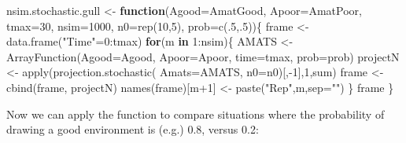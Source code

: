 \documentclass[
]{book}
\newenvironment{Shaded}{\begin{snugshade}}{\end{snugshade}}
\newcommand{\AttributeTok}[1]{\textcolor[rgb]{0.77,0.63,0.00}{#1}}
\newcommand{\ControlFlowTok}[1]{\textcolor[rgb]{0.13,0.29,0.53}{\textbf{#1}}}
\newcommand{\DecValTok}[1]{\textcolor[rgb]{0.00,0.00,0.81}{#1}}
\newcommand{\FunctionTok}[1]{\textcolor[rgb]{0.00,0.00,0.00}{#1}}
\newcommand{\NormalTok}[1]{#1}
\newcommand{\OtherTok}[1]{\textcolor[rgb]{0.56,0.35,0.01}{#1}}
\newcommand{\SpecialCharTok}[1]{\textcolor[rgb]{0.00,0.00,0.00}{#1}}
\newcommand{\StringTok}[1]{\textcolor[rgb]{0.31,0.60,0.02}{#1}}
\begin{document}
\begin{Shaded}
\begin{Highlighting}[]
\NormalTok{nsim.stochastic.gull }\OtherTok{\textless{}{-}} \ControlFlowTok{function}\NormalTok{(}\AttributeTok{Agood=}\NormalTok{AmatGood, }
                                 \AttributeTok{Apoor=}\NormalTok{AmatPoor, }
                                 \AttributeTok{tmax=}\DecValTok{30}\NormalTok{, }
                                 \AttributeTok{nsim=}\DecValTok{1000}\NormalTok{, }
                                 \AttributeTok{n0=}\FunctionTok{rep}\NormalTok{(}\DecValTok{10}\NormalTok{,}\DecValTok{5}\NormalTok{), }
                                 \AttributeTok{prob=}\FunctionTok{c}\NormalTok{(.}\DecValTok{5}\NormalTok{,.}\DecValTok{5}\NormalTok{))\{}
\NormalTok{  frame }\OtherTok{\textless{}{-}}  \FunctionTok{data.frame}\NormalTok{(}\StringTok{"Time"}\OtherTok{=}\DecValTok{0}\SpecialCharTok{:}\NormalTok{tmax)}
  \ControlFlowTok{for}\NormalTok{(m }\ControlFlowTok{in} \DecValTok{1}\SpecialCharTok{:}\NormalTok{nsim)\{}
\NormalTok{    AMATS }\OtherTok{\textless{}{-}} \FunctionTok{ArrayFunction}\NormalTok{(}\AttributeTok{Agood=}\NormalTok{Agood, }
                           \AttributeTok{Apoor=}\NormalTok{Apoor,}
                           \AttributeTok{time=}\NormalTok{tmax, }
                           \AttributeTok{prob=}\NormalTok{prob)}
\NormalTok{    projectN }\OtherTok{\textless{}{-}} \FunctionTok{apply}\NormalTok{(}\FunctionTok{projection.stochastic}\NormalTok{(}
      \AttributeTok{Amats=}\NormalTok{AMATS,  }\AttributeTok{n0=}\NormalTok{n0)[,}\SpecialCharTok{{-}}\DecValTok{1}\NormalTok{],}\DecValTok{1}\NormalTok{,sum)}
\NormalTok{    frame }\OtherTok{\textless{}{-}} \FunctionTok{cbind}\NormalTok{(frame, projectN)}
     \FunctionTok{names}\NormalTok{(frame)[m}\SpecialCharTok{+}\DecValTok{1}\NormalTok{] }\OtherTok{\textless{}{-}} \FunctionTok{paste}\NormalTok{(}\StringTok{"Rep"}\NormalTok{,m,}\AttributeTok{sep=}\StringTok{""}\NormalTok{)}
\NormalTok{  \}}
\NormalTok{  frame}
\NormalTok{\}}
\end{Highlighting}
\end{Shaded}

Now we can apply the function to compare situations where the probability of drawing a good environment is (e.g.) 0.8, versus 0.2:
\end{document}

